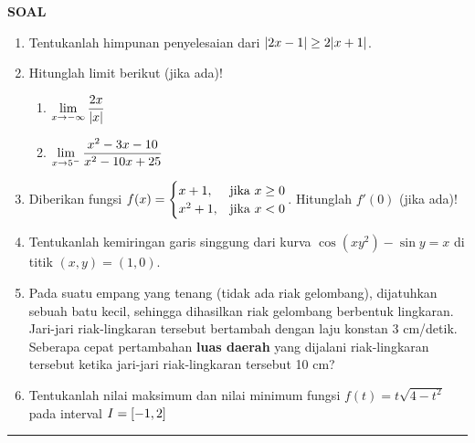 \begin{center}
\textbf{\large{SOAL}}
\end{center}
\begin{enumerate}[leftmargin=*, label={\arabic*}.]
\item Tentukanlah himpunan penyelesaian dari $\abs{2x-1} \geq 2\abs{x+1}$.
\item Hitunglah limit berikut (jika ada)!
    \begin{enumerate}[label={\alph*}.]
    \item $\ds \lim_{x\to -\infty} \frac{2x}{\abs{x}}$
    \item $\ds \lim_{x\to 5^{-}} \frac{x^{2}-3x-10}{x^{2}-10x+25}$
    \end{enumerate}
\item Diberikan fungsi 
$\ds f(x) = 
\begin{cases}
    x+1, &\text{jika $x \geq 0$}\\
    x^{2}+1, &\text{jika $x < 0$}
\end{cases}$. 
Hitunglah $f'(0)$ (jika ada)!
\item Tentukanlah kemiringan garis singgung dari kurva $\cos (xy^{2})-\sin y = x$ 
di titik $(x,y) = (1,0)$.
\item Pada suatu empang yang tenang (tidak ada riak gelombang), dijatuhkan sebuah 
batu kecil, sehingga dihasilkan riak gelombang berbentuk lingkaran. Jari-jari 
riak-lingkaran tersebut bertambah dengan laju konstan 3 cm/detik. Seberapa cepat 
pertambahan \textbf{luas daerah} yang dijalani riak-lingkaran tersebut ketika 
jari-jari riak-lingkaran tersebut 10 cm?
\item Tentukanlah nilai maksimum dan nilai minimum fungsi $f(t)=t\sqrt{4-t^{2}}$ 
pada interval $I = \cic*{-1,2}$
\end{enumerate}


\vspace{0.2cm}\hrule height 1pt


